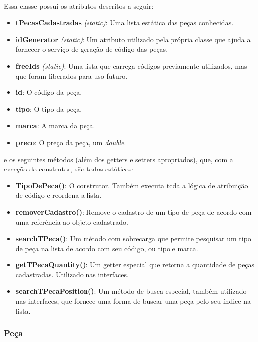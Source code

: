 \documentclass[a4paper,12pt]{article}
\begin{document}
\paragraph{}
Essa classe possui os atributos descritos a seguir:

\begin{itemize}[noitemsep]
    \item \textbf{tPecasCadastradas} \textit{(static)}: Uma lista estática das peças conhecidas.
    \item \textbf{idGenerator} \textit{(static)}: Um atributo utilizado pela própria classe que ajuda a fornecer o serviço de geração de código das peças.
    \item \textbf{freeIds} \textit{(static)}: Uma lista que carrega códigos previamente utilizados, mas que foram liberados para uso futuro.
    \item \textbf{id}: O código da peça.
    \item \textbf{tipo}: O tipo da peça.
    \item \textbf{marca}: A marca da peça.
    \item \textbf{preco}: O preço da peça, um \textit{double}.
\end{itemize}

\noindent e os seguintes métodos (além dos getters e setters apropriados), que, com a exceção do construtor, são todos estáticos:
\begin{itemize}[noitemsep]
    \item \textbf{TipoDePeca()}: O construtor. Também executa toda a lógica de atribuição de código e reordena a lista.
    \item \textbf{removerCadastro()}: Remove o cadastro de um tipo de peça de acordo com uma referência ao objeto cadastrado.
    \item \textbf{searchTPeca()}: Um método com sobrecarga que permite pesquisar um tipo de peça na lista de acordo com seu código, ou tipo e marca.
    \item \textbf{getTPecaQuantity()}: Um getter especial que retorna a quantidade de peças cadastradas. Utilizado nas interfaces.
    \item \textbf{searchTPecaPosition()}: Um método de busca especial, também utilizado nas interfaces, que fornece uma forma de buscar uma peça pelo seu índice na lista.
\end{itemize}

\subsubsection{Peça}
\end{document}

